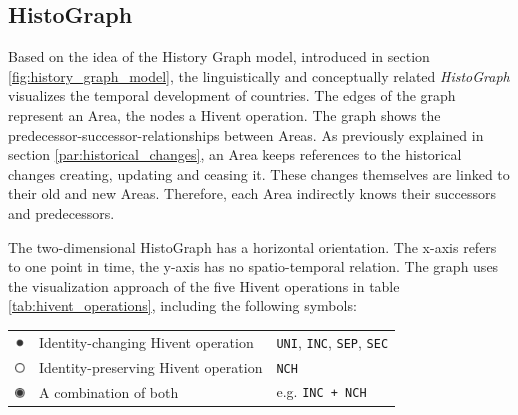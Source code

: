
\subsection{HistoGraph} %
\label{sub:histograph}

Based on the idea of the History Graph model, introduced in section \ref{fig:history_graph_model}, the linguistically and conceptually related \emph{HistoGraph} visualizes the temporal development of countries. The edges of the graph represent an Area, the nodes a Hivent operation. The graph shows the predecessor-successor-relationships between Areas. As previously explained in section \ref{par:historical_changes}, an Area keeps references to the historical changes creating, updating and ceasing it. These changes themselves are linked to their old and new Areas. Therefore, each Area indirectly knows their successors and predecessors.

The two-dimensional HistoGraph has a horizontal orientation. The x-axis refers to one point in time, the y-axis has no spatio-temporal relation. The graph uses the visualization approach of the five Hivent operations in table \ref{tab:hivent_operations}, including the following symbols:

\begin{table}[H]
\begin{center}
\begin{tabular}{c l l}

  \raisebox{3.5\height}

  \raisebox{-0.2\height}
  {\includegraphics[width=10px]{graphics/development/hivent_model/histograph/circle_filled}}
  & Identity-changing Hivent operation
  & \texttt{UNI}, \texttt{INC}, \texttt{SEP}, \texttt{SEC} \\

  \raisebox{-0.2\height}
  {\includegraphics[width=10px]{graphics/development/hivent_model/histograph/circle_unfilled}}
  & Identity-preserving Hivent operation
  & \texttt{NCH} \\

  \raisebox{-0.2\height}
  {\includegraphics[width=10px]{graphics/development/hivent_model/histograph/circle_combo}}
  & A combination of both
  & e.g. \texttt{INC + NCH}

\end{tabular}
\label{tab:histograph_symbols}
\end{center}
\end{table}

